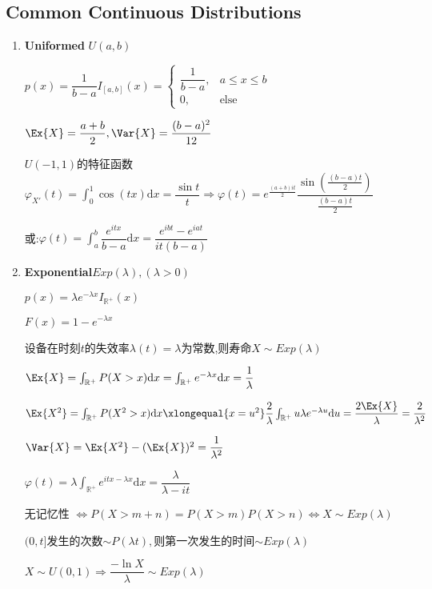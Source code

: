     \subsection{Common Continuous Distributions}
    \begin{enumerate}
      \item \textbf{Uniformed} $U(a,b)$

        $p(x) = \dfrac{1}{b-a}I_{[a,b]}(x) = \left \{ \begin{matrix}\dfrac{1}{b-a}, & a\le x \le b \\0, &  \text{else}\end{matrix}\right.$

        $\Ex{X} = \dfrac{a+b}{2}, \Var{X} = \dfrac{(b-a)^2}{12}$

        $ U(-1,1)$的特征函数$\varphi_{X'}(t)=\int_{0}^1{\cos(tx)\mathrm{d}x} = \dfrac{\sin t}{t}\Rightarrow \varphi(t) =
      e^{\frac{(a+b)it}{2}}\dfrac{\sin(\frac{(b-a)t}{2})}{\frac{(b-a)t}{2}}$

      或:$ \varphi(t) = \int_{a}^b{\dfrac{e^{itx}}{b-a}\mathrm{d}x} = \dfrac{e^{ibt}-e^{iat}}{it(b-a)}$

    \item \textbf{Exponential}$Exp(\lambda),(\lambda > 0)$

      $p(x) = \lambda e^{-\lambda x}I_{\mathbb{R^+}}(x)$

      $F(x) = 1-e^{-\lambda x}$

      设备在时刻$t$的失效率$\lambda(t) = \lambda$为常数,则寿命$X\sim Exp(\lambda)$

      $\Ex{X} = \int_{\mathbb{R^+}}{P(X>x)\mathrm{d}x} = \int_{\mathbb{R^+}}{e^{-\lambda x}\mathrm{d}x} = \dfrac{1}{\lambda}$

      $ \Ex{X^2} = \int_{\mathbb{R^+}}{P(X^2 > x)\mathrm{d}x} \xlongequal{x = u^2} \dfrac{2}{\lambda}\int_{\mathbb{R^+}}{u\lambda e^{-\lambda u}\mathrm{d}u}
      = \dfrac{2\Ex{X}}{\lambda} = \dfrac{2}{\lambda^2}$

      $\Var{X} = \Ex{X^2} - (\Ex{X})^2 = \dfrac{1}{\lambda^2}$

      $ \varphi(t) = \lambda\int_{\mathbb{R}^+}e^{itx-\lambda x}\mathrm{d}x=\dfrac{\lambda}{\lambda-it}$

      无记忆性 $\Leftrightarrow P(X>m+n) = P(X>m)P(X>n)\Leftrightarrow X\sim Exp(\lambda)$

          $(0,t]$发生的次数$\sim P(\lambda t),$则第一次发生的时间$\sim Exp(\lambda)$

          $ X\sim U(0,1)\Rightarrow  \dfrac{-\ln X}{\lambda}\sim Exp(\lambda)$


\end{enumerate}
